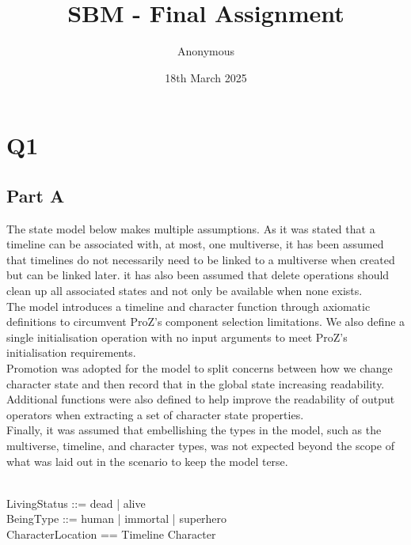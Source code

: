 \documentclass{article}
\title{SBM - Final Assignment}
\date{18th March 2025}
\author{Anonymous}
\begin{document}
\maketitle

\pagebreak 

\section*{Q1}

\subsection*{Part A}

The state model below makes multiple assumptions. As it was stated that a timeline can be associated with, at most, one multiverse, it has been assumed that timelines do not necessarily need to be linked to a multiverse when created but can be linked later. it has also been assumed that delete operations should clean up all associated states and not only be available when none exists. \\
\newline
The model introduces a timeline and character function through axiomatic definitions to circumvent ProZ's component selection limitations. We also define a single initialisation operation with no input arguments to meet ProZ's initialisation requirements. \\ 
\newline
Promotion was adopted for the model to split concerns between how we change character state and then record that in the global state increasing readability. Additional functions were also defined to help improve the readability of output operators when extracting a set of character state properties. \\
\newline
Finally, it was assumed that embellishing the types in the model, such as the multiverse, timeline, and character types, was not expected beyond the scope of what was laid out in the scenario to keep the model terse.

\begin{zed}
 \\
LivingStatus ::= dead | alive \\
BeingType ::= human | immortal | superhero \\
CharacterLocation == Timeline \cross Character \\
\end{zed}
\end{document}
